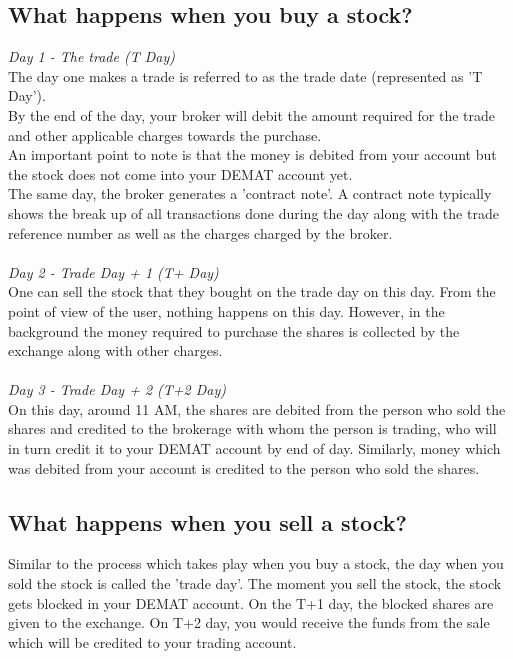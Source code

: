\subsection{What happens when you buy a stock?}
\textit{\large{Day 1 - The trade (T Day)}}
\\
The day one makes a trade is referred to as the trade date (represented as 'T Day').
\\
By the end of the day, your broker will debit the amount required for the trade and other applicable charges towards the purchase.
\\
An important point to note is that the money is debited from your account but the stock does not come into your DEMAT account yet.
\\
The same day, the broker generates a 'contract note'. A contract note typically shows the break up of all transactions done during the day along with the trade reference number as well as the charges charged by the broker. \\
\\
\textit{\large{Day 2 - Trade Day + 1 (T+ Day)}}
\\
One can sell the stock that they bought on the trade day on this day.
\noindent From the point of view of the user, nothing happens on this day. However, in the background the money required to purchase the shares is collected by the exchange along with other charges. \\
\\
\textit{\large{Day 3 - Trade Day + 2 (T+2 Day)}}
\\
On this day, around 11 AM, the shares are debited from the person who sold the shares and credited to the brokerage with whom the person is trading, who will in turn credit it to your DEMAT account by end of day. Similarly, money which was debited from your account is credited to the person who sold the shares.

\subsection{What happens when you sell a stock?}
Similar to the process which takes play when you buy a stock, the day when you sold the stock is called the 'trade day'. The moment you sell the stock, the stock gets blocked in your DEMAT account. On the T+1 day, the blocked shares are given to the exchange. On T+2 day, you would receive the funds from the sale which will be credited to your trading account.


